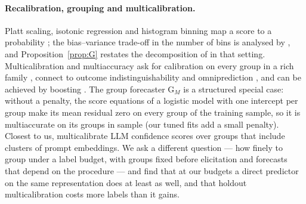 \documentclass[twoside]{article}
\theoremstyle{definition}
\theoremstyle{remark}
\newcommand{\1}{\mathbf{1}}
\begin{document}
\paragraph{Recalibration, grouping and multicalibration.} Platt scaling, isotonic regression and
histogram binning map a score to a probability \citep{platt1999probabilistic,zadrozny2002transforming,guo2017calibration};
the bias--variance trade-off in the number of bins is analysed by
\citet{kumar2019verified,gupta2021distribution,sun2023minimum,futami2024information}, and
Proposition~\ref{prop:G} restates the decomposition of \citet{murphy1973new} in that setting.
Multicalibration and multiaccuracy ask for calibration on every group in a rich family
\citep{hebertjohnson2018multicalibration,kim2019multiaccuracy,shabat2020sample}, connect to outcome
indistinguishability and omniprediction \citep{dwork2021outcome,gopalan2022omnipredictors}, and can be
achieved by boosting \citep{globusharris2023multicalibration}. The group forecaster G$_M$ is a structured
special case: without a penalty, the score equations of a logistic model with one intercept per group
make its mean residual zero on every group of the training sample, so it is multiaccurate on its
groups in sample (our tuned fits add a small penalty). Closest to us, \citet{detommaso2024multicalibration} multicalibrate LLM confidence
scores over groups that include clusters of prompt embeddings. We ask a different question --- how
finely to group under a label budget, with groups fixed before elicitation and forecasts that depend
on the procedure --- and find that at our budgets a direct predictor on the same representation does
at least as well, and that holdout multicalibration costs more labels than it gains.
\end{document}
